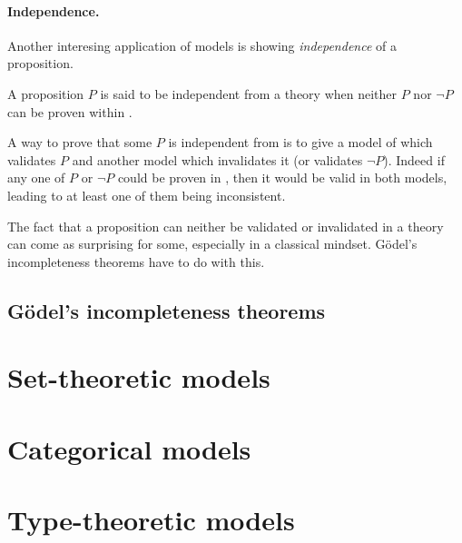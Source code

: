 \paragraph{Independence.}

Another interesing application of models is showing \emph{independence} of a
proposition.

\begin{definition}
  A proposition \(P\) is said to be independent from a theory \cT when neither
  \(P\) nor \(\neg P\) can be proven within \cT.
\end{definition}

A way to prove that some \(P\) is independent from \cT is to give a model of \cT
which validates \(P\) and another model which invalidates it (or validates
\(\neg P\)). Indeed if any one of \(P\) or \(\neg P\) %
could be proven in \cT, then it would be valid in both models, leading to
at least one of them being inconsistent.

The fact that a proposition can neither be validated or invalidated in a theory
can come as surprising for some, especially in a classical mindset.
Gödel's incompleteness theorems have to do with this.

\subsection{Gödel's incompleteness theorems}


\section{Set-theoretic models}

\section{Categorical models}

\section{Type-theoretic models}

